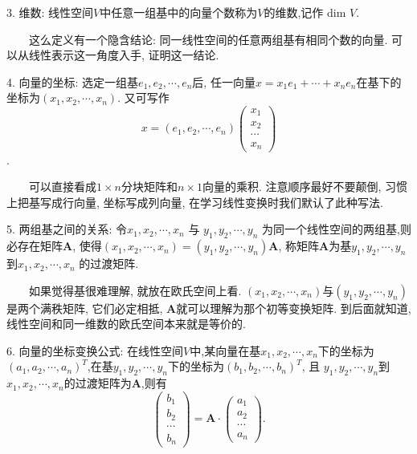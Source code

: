 3. 维数: 线性空间$V$中任意一组基中的向量个数称为$V$的维数,记作 dim $V$. 

\begin{tcolorbox}[colback=blue!5,colframe=blue!75!black,title=定义解析]
    ~~~~这么定义有一个隐含结论: 同一线性空间的任意两组基有相同个数的向量. 可以从线性表示这一角度入手, 证明这一结论.
\end{tcolorbox}

4. 向量的坐标: 选定一组基$e_1,e_2,\cdots,e_n$后, 任一向量$x=x_1e_1+\cdots+x_ne_n$在基下的坐标为$(x_1,x_2,\cdots,x_n)$.
又可写作
\begin{equation*}
    x=(e_1,e_2,\cdots,e_n)\begin{pmatrix}
        x_1 \\
        x_2\\
        \cdots\\
        x_n
    \end{pmatrix}
\end{equation*}.

\begin{tcolorbox}[colback=gray!5,colframe=orange!75!black,title=注意事项]
    ~~~~可以直接看成$1\times n$分块矩阵和$n \times 1$向量的乘积. 注意顺序最好不要颠倒, 习惯上把基写成行向量, 坐标写成列向量, 
    在学习线性变换时我们默认了此种写法.
  \end{tcolorbox}

5. 两组基之间的关系: 令$x_1,x_2,\cdots,x_n$ 与 $y_1,y_2,\cdots,y_n$ 为同一个线性空间的两组基,则必存在矩阵\textbf{A}, 
使得$(x_1,x_2,\cdots,x_n)=(y_1,y_2,\cdots,y_n)\textbf{A}$, 称矩阵\textbf{A}为基$y_1,y_2,\cdots,y_n$到$x_1,x_2,\cdots,x_n$ 的过渡矩阵.

\begin{tcolorbox}[colback=yellow!10,colframe=red!75!black,title=小窍门]
    ~~~~如果觉得基很难理解, 就放在欧氏空间上看. $(x_1,x_2,\cdots,x_n)$与$(y_1,y_2,\cdots,y_n)$是两个满秩矩阵, 它们必定相抵, \textbf{A}就可以理解为那个初等变换矩阵. 
    到后面就知道, 线性空间和同一维数的欧氏空间本来就是等价的.
\end{tcolorbox}


6. 向量的坐标变换公式: 在线性空间$V$中,某向量在基$x_1,x_2,\cdots,x_n$下的坐标为$(a_1,a_2,\cdots,a_n)^T$,在基$y_1,y_2,\cdots,y_n$下的坐标为$(b_1,b_2,\cdots,b_n)^T$, 且
$y_1,y_2,\cdots,y_n$到$x_1,x_2,\cdots,x_n$的过渡矩阵为\textbf{A},则有
\begin{equation*}
    \begin{pmatrix}
        b_1\\
        b_2\\
        \cdots\\
        b_n
    \end{pmatrix}=\textbf{A}\cdot
    \begin{pmatrix}
        a_1\\
        a_2\\
        \cdots\\
        a_n
    \end{pmatrix}.
\end{equation*}

